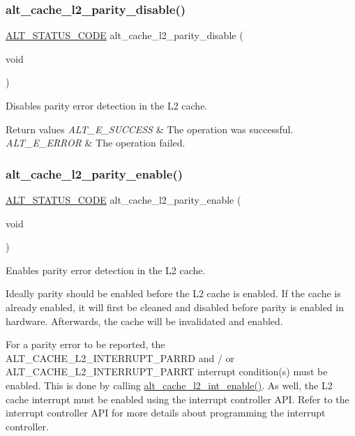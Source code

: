 \subsubsection{\texorpdfstring{alt\_cache\_l2\_parity\_disable()}{alt\_cache\_l2\_parity\_disable()}}
{\footnotesize\ttfamily \mbox{\hyperlink{hwlib_8h_abdb0d369f069723ca55d6c94bcaaaa12}{A\+L\+T\+\_\+\+S\+T\+A\+T\+U\+S\+\_\+\+C\+O\+DE}} alt\+\_\+cache\+\_\+l2\+\_\+parity\+\_\+disable (\begin{DoxyParamCaption}\item[{void}]{ }\end{DoxyParamCaption})}

Disables parity error detection in the L2 cache.


\begin{DoxyRetVals}{Return values}
{\em A\+L\+T\+\_\+\+E\+\_\+\+S\+U\+C\+C\+E\+SS} & The operation was successful. \\
\hline
{\em A\+L\+T\+\_\+\+E\+\_\+\+E\+R\+R\+OR} & The operation failed. \\
\hline
\end{DoxyRetVals}
\mbox{\label{group__CACHE__L2_ga0101cd8cb7724cdaf24f6118b43da644}} 
\subsubsection{\texorpdfstring{alt\_cache\_l2\_parity\_enable()}{alt\_cache\_l2\_parity\_enable()}}
{\footnotesize\ttfamily \mbox{\hyperlink{hwlib_8h_abdb0d369f069723ca55d6c94bcaaaa12}{A\+L\+T\+\_\+\+S\+T\+A\+T\+U\+S\+\_\+\+C\+O\+DE}} alt\+\_\+cache\+\_\+l2\+\_\+parity\+\_\+enable (\begin{DoxyParamCaption}\item[{void}]{ }\end{DoxyParamCaption})}

Enables parity error detection in the L2 cache.

Ideally parity should be enabled before the L2 cache is enabled. If the cache is already enabled, it will first be cleaned and disabled before parity is enabled in hardware. Afterwards, the cache will be invalidated and enabled.

For a parity error to be reported, the A\+L\+T\+\_\+\+C\+A\+C\+H\+E\+\_\+\+L2\+\_\+\+I\+N\+T\+E\+R\+R\+U\+P\+T\+\_\+\+P\+A\+R\+RD and / or A\+L\+T\+\_\+\+C\+A\+C\+H\+E\+\_\+\+L2\+\_\+\+I\+N\+T\+E\+R\+R\+U\+P\+T\+\_\+\+P\+A\+R\+RT interrupt condition(s) must be enabled. This is done by calling \mbox{\hyperlink{group__CACHE__L2_ga5cd474d1aebc852e901ddc988de2a62d}{alt\+\_\+cache\+\_\+l2\+\_\+int\+\_\+enable()}}. As well, the L2 cache interrupt must be enabled using the interrupt controller A\+PI. Refer to the interrupt controller A\+PI for more details about programming the interrupt controller.

